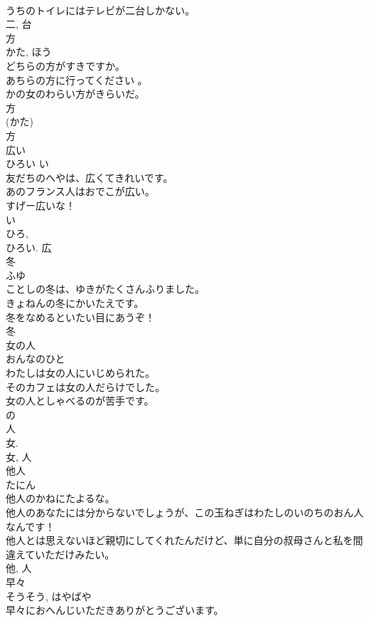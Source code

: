 \documentclass[8pt]{extreport}
\begin{document}
\begin{CJK}{UTF8}{min}
\\	うちのトイレにはテレビが二台しかない。	
\\	二, 台	
\\	方	
\\	かた, ほう	
\\	どちらの方がすきですか。	
\\	あちらの方に行ってください 。	
\\	かの女のわらい方がきらいだ。	
\\	方 
\\	(かた) 
\\	方	
\\	広い	
\\	ひろい	い 
\\	友だちのへやは、広くてきれいです。	
\\	あのフランス人はおでこが広い。	
\\	すげー広いな！	
\\	い 
\\	ひろ, 
\\	ひろい.	広	
\\	冬	
\\	ふゆ	
\\	ことしの冬は、ゆきがたくさんふりました。	
\\	きょねんの冬にかいたえです。	
\\	冬をなめるといたい目にあうぞ！	
\\	冬	
\\	女の人	
\\	おんなのひと	
\\	わたしは女の人にいじめられた。	
\\	そのカフェは女の人だらけでした。	
\\	女の人としゃべるのが苦手です。	
\\	の 
\\	人 
\\	女. 
\\	女, 人	
\\	他人	
\\	たにん	
\\	他人のかねにたよるな。	
\\	他人のあなたには分からないでしょうが、この玉ねぎはわたしのいのちのおん人なんです！	
\\	他人とは思えないほど親切にしてくれたんだけど、単に自分の叔母さんと私を間違えていただけみたい。	
\\	他, 人	
\\	早々	
\\	そうそう, はやばや	
\\	早々におへんじいただきありがとうございます。	

\end{CJK}
\end{document}
